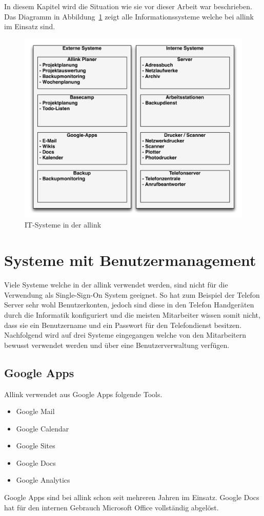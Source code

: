 In diesem Kapitel wird die Situation wie sie vor dieser Arbeit war beschrieben. Das Diagramm in Abbildung~\ref{fig:systemlandschaft} zeigt alle Informationssysteme welche bei allink im Einsatz sind.
\begin{figure}[h]
  \centering
	\includegraphics[width=1\textwidth]{include/systemlandschaft.pdf}
	\caption{IT-Systeme in der allink}
	\label{fig:systemlandschaft}
\end{figure}


\section{Systeme mit Benutzermanagement}
\label{sec:Systeme mit Benutzermanagement}
Viele Systeme welche in der allink verwendet werden, sind nicht für die Verwendung als Single-Sign-On System geeignet. So hat zum Beispiel der Telefon Server sehr wohl Benutzerkonten, jedoch sind diese in den Telefon Handgeräten durch die Informatik konfiguriert und die meisten Mitarbeiter wissen somit nicht, dass sie ein Benutzername und ein Passwort für den Telefondienst besitzen. Nachfolgend wird auf drei Systeme eingegangen welche von den Mitarbeitern bewusst verwendet werden und über eine Benutzerverwaltung verfügen.

\subsection{Google Apps}
\label{subs:Google_Apps}
Allink verwendet aus Google Apps folgende Tools. 
\begin{itemize}
	\item Google Mail 
	\item Google Calendar 
	\item Google Sites 
	\item Google Docs 
	\item Google Analytics 
\end{itemize}
Google Apps sind bei allink schon seit mehreren Jahren im Einsatz. Google Docs hat für den internen Gebrauch Microsoft Office vollständig abgelöst.

